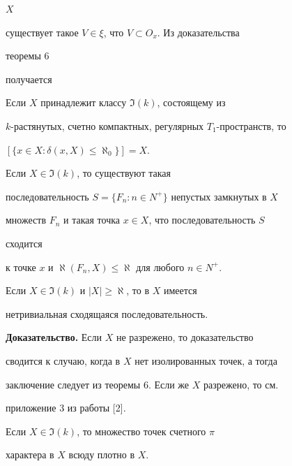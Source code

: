 $X$ 


существует такое $V\in\xi$, что $V\subset O_x$. Из доказательства 


теоремы 6  


получается  


 


\begin{thm} 


Если $X$ принадлежит классу $\Im(k)$, состоящему из 


$k$-растянутых, счетно компактных, регулярных $T_1$-пространств, то  


$[\{x\in X:\delta(x,X)\le\aleph_0\}]=X$. 


\end{thm} 


 


\begin{cor} 


Если $X\in\Im(k)$, то существуют такая  


последовательность $S=\{F_n:n\in N^+\}$ непустых замкнутых в $X$ 


множеств $F_n$ и такая точка $x\in X$, что последовательность $S$ 


сходится  


к точке $x$ и $\aleph(F_n,X)\le\aleph$ для любого $n\in N^+$. 


\end{cor} 


 


\begin{cor} Если $X\in\Im(k)$ и $|X|\ge\aleph$, то в $X$ имеется


нетривиальная сходящаяся последовательность. 


\end{cor} 


 


{\bf Доказательство.} Если $X$ не разрежено, то доказательство  


сводится к случаю, когда в $X$ нет изолированных точек, а тогда 


заключение следует из теоремы 6. Если же $X$ разрежено, то см.  


приложение 3 из работы [2]. 


 


\begin{cor} 


Если $X\in\Im(k)$, то множество точек счетного $\pi$ 


характера в $X$ всюду плотно в $X$. 


\end{cor} 


